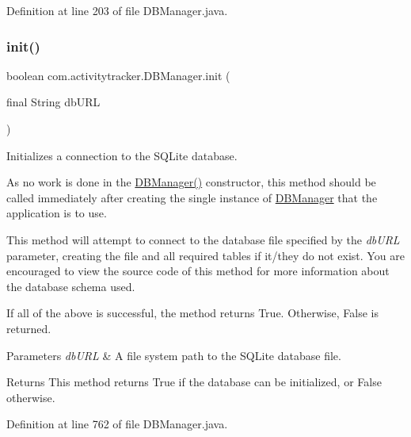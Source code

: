 Definition at line 203 of file D\+B\+Manager.\+java.

\mbox{\label{classcom_1_1activitytracker_1_1_d_b_manager_a41df4600bb5901a26a4ea6a7108a70b9}} 
\subsubsection{\texorpdfstring{init()}{init()}}
{\footnotesize\ttfamily boolean com.\+activitytracker.\+D\+B\+Manager.\+init (\begin{DoxyParamCaption}\item[{final String}]{db\+U\+RL }\end{DoxyParamCaption})\hspace{0.3cm}{\ttfamily [package]}}

Initializes a connection to the S\+Q\+Lite database.

As no work is done in the \mbox{\hyperlink{classcom_1_1activitytracker_1_1_d_b_manager_ac1f558ef56fe02d74fe103a473a15bb5}{D\+B\+Manager()}} constructor, this method should be called immediately after creating the single instance of \mbox{\hyperlink{classcom_1_1activitytracker_1_1_d_b_manager}{D\+B\+Manager}} that the application is to use.

This method will attempt to connect to the database file specified by the {\itshape db\+U\+RL} parameter, creating the file and all required tables if it/they do not exist. You are encouraged to view the source code of this method for more information about the database schema used.

If all of the above is successful, the method returns True. Otherwise, False is returned.


\begin{DoxyParams}{Parameters}
{\em db\+U\+RL} & A file system path to the S\+Q\+Lite database file.\\
\hline
\end{DoxyParams}
\begin{DoxyReturn}{Returns}
This method returns True if the database can be initialized, or False otherwise. 
\end{DoxyReturn}


Definition at line 762 of file D\+B\+Manager.\+java.

